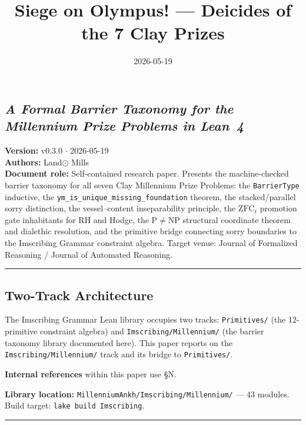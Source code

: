 \documentclass[12pt,a4paper]{article}
\newcommand{\pilcrow}{\S}
\begin{document}
\title{Siege on Olympus! --- Deicides of the 7 Clay Prizes}
\date{2026-05-19}

\maketitle

\subsection{\emph{A Formal Barrier Taxonomy for the Millennium Prize Problems in Lean~4}}

\noindent\textbf{Version:} v0.3.0 $\cdot$ 2026-05-19 \\
\textbf{Authors:} Land$\odot$ Mills \\
\textbf{Document role:} Self-contained research paper. Presents the machine-checked barrier taxonomy for all seven Clay Millennium Prize Problems: the \texttt{BarrierType} inductive, the \texttt{ym\_is\_unique\_missing\_foundation} theorem, the stacked/parallel sorry distinction, the vessel--content inseparability principle, the $\mathrm{ZFC}_t$ promotion gate inhabitants for RH and Hodge, the P$\neq$NP structural coordinate theorem and dialethic resolution, and the primitive bridge connecting sorry boundaries to the Imscribing Grammar constraint algebra. Target venue: Journal of Formalized Reasoning / Journal of Automated Reasoning.

\begin{center}
\rule{0.5\textwidth}{0.4pt}
\end{center}

\subsection{Two-Track Architecture}

The Imscribing Grammar Lean library occupies two tracks: \texttt{Primitives/} (the 12-primitive constraint algebra) and \texttt{Imscribing/Millennium/} (the barrier taxonomy library documented here). This paper reports on the \texttt{Imscribing/Millennium/} track and its bridge to \texttt{Primitives/}.

\textbf{Internal references} within this paper use \pilcrow{}N.

\textbf{Library location:} \texttt{MillenniumAnkh/Imscribing/Millennium/} --- 43 modules. Build target: \texttt{lake build Imscribing}.

\begin{center}
\rule{0.5\textwidth}{0.4pt}
\end{center}
\end{document}
